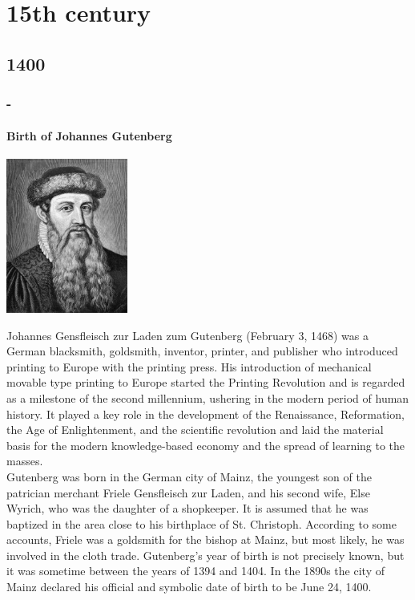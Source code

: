 \documentclass[11pt]{report}
\begin{document}
					
\part{15th century}
\chapter{1400}
\section{-}
\subsection{Birth of Johannes Gutenberg}
\vspace{2mm}\begin{center}\includegraphics[width=4cm]{./img/gutenberg.jpg}\end{center}
Johannes Gensfleisch zur Laden zum Gutenberg (February 3, 1468) was a German blacksmith, goldsmith, inventor, printer, and publisher who introduced printing to Europe with the printing press. His introduction of mechanical movable type printing to Europe started the Printing Revolution and is regarded as a milestone of the second millennium, ushering in the modern period of human history. It played a key role in the development of the Renaissance, Reformation, the Age of Enlightenment, and the scientific revolution and laid the material basis for the modern knowledge-based economy and the spread of learning to the masses.\\
\indent Gutenberg was born in the German city of Mainz, the youngest son of the patrician merchant Friele Gensfleisch zur Laden, and his second wife, Else Wyrich, who was the daughter of a shopkeeper. It is assumed that he was baptized in the area close to his birthplace of St. Christoph. According to some accounts, Friele was a goldsmith for the bishop at Mainz, but most likely, he was involved in the cloth trade. Gutenberg's year of birth is not precisely known, but it was sometime between the years of 1394 and 1404. In the 1890s the city of Mainz declared his official and symbolic date of birth to be June 24, 1400.
\end{document}
